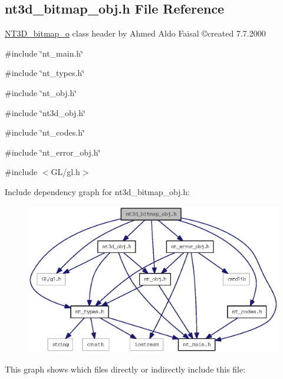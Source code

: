 \subsection{nt3d\_\-bitmap\_\-obj.h File Reference}
\label{nt3d__bitmap__obj_8h}



\begin{DoxyItemize}
\item \hyperlink{class_n_t3_d__bitmap__o}{NT3D\_\-bitmap\_\-o} class header by Ahmed Aldo Faisal \copyright created 7.7.2000 
\end{DoxyItemize} 


{\ttfamily \#include \char`\"{}nt\_\-main.h\char`\"{}}\par
{\ttfamily \#include \char`\"{}nt\_\-types.h\char`\"{}}\par
{\ttfamily \#include \char`\"{}nt\_\-obj.h\char`\"{}}\par
{\ttfamily \#include \char`\"{}nt3d\_\-obj.h\char`\"{}}\par
{\ttfamily \#include \char`\"{}nt\_\-codes.h\char`\"{}}\par
{\ttfamily \#include \char`\"{}nt\_\-error\_\-obj.h\char`\"{}}\par
{\ttfamily \#include $<$GL/gl.h$>$}\par
Include dependency graph for nt3d\_\-bitmap\_\-obj.h:
\nopagebreak
\begin{figure}[H]
\begin{center}
\leavevmode
\includegraphics[width=400pt]{nt3d__bitmap__obj_8h__incl}
\end{center}
\end{figure}
This graph shows which files directly or indirectly include this file:
\nopagebreak
